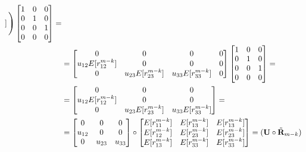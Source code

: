 \documentclass[\main/main.tex]{subfiles}
\begin{document}
\begin{equation}
\begin{split}
\begin{bmatrix}
    \end{bmatrix} 
     \Bigg)
       \begin{bmatrix}
    1 & 0 & 0\\
    0 & 1& 0\\
    0 & 0 & 1\\
    0 & 0 & 0\\
    \end{bmatrix} =\\
    &=
    \begin{bmatrix}
    0 & 0 & 0 & 0\\
    u_{12}E[r^{m-k}_{12}] & 0 & 0 & 0\\
    0 & u_{23}E[r^{m-k}_{23}] & u_{33}E[r^{m-k}_{33}] & 0
    \end{bmatrix}
    \begin{bmatrix}
    1 & 0 & 0\\
    0 & 1& 0\\
    0 & 0 & 1\\
    0 & 0 & 0\\
    \end{bmatrix} =\\
    &=
    \begin{bmatrix}
    0 & 0 &0\\
    u_{12}E[r^{m-k}_{12}] & 0 & 0\\
    0 & u_{23}E[r^{m-k}_{23}] & u_{33}E[r^{m-k}_{33}]
    \end{bmatrix} =\\
    &=
    \begin{bmatrix}
     0 & 0 &0\\
    u_{12} & 0 & 0\\
    0 & u_{23}& u_{33}\\
    \end{bmatrix}
    \circ
    \begin{bmatrix}
     E[r^{m-k}_{11}]& E[r^{m-k}_{13}] &E[r^{m-k}_{13}]\\
   E[r^{m-k}_{12}] & E[r^{m-k}_{23}]& E[r^{m-k}_{23}]\\
     E[r^{m-k}_{13}] & E[r^{m-k}_{33}] & E[r^{m-k}_{33}]\\
    \end{bmatrix} = (\mathbf{U}\circ \Tilde{\mathbf{R}}_{m-k})
     \end{split}
 \end{equation}
\end{document}
